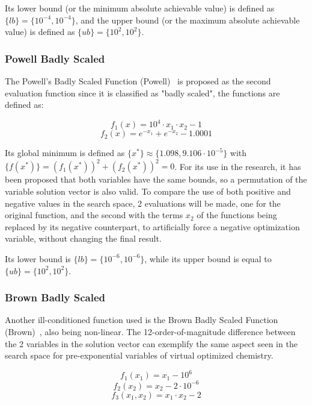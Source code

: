 \documentclass[10pt,fleqn,a4paper,twoside]{article}
\begin{document}
Its lower bound (or the minimum absolute achievable value) is defined as $\{lb\} = \{10^{-4}, 10^{-4}\}$, and the upper bound (or the maximum absolute achievable value) is defined as $\{ub\} = \{10^{2}, 10^{2}\}$.



\subsubsection{Powell Badly Scaled}
The Powell's Badly Scaled Function (Powell)~\citep{More1981TestFunctions} is proposed as the second evaluation function since it is classified as "badly scaled", the functions are defined as:

\begin{equation}
f_1(x) = 10^4 \cdot x_1 \cdot x_2 -1
\label{Eq:powell1}
\end{equation}
\begin{equation}
f_2(x) = e^{-x_1} + e^{-x_2} - 1.0001 
\label{Eq:powell2}
\end{equation}

Its global minimum is defined as $\{x^*\} \approx \{1.098, 9.106\cdot10^{-5}\}$ with $\{f(x^*)\} = (f_1(x^*))^2 + (f_2(x^*))^2 = 0$. For its use in the research, it has been proposed that 
both variables have the same bounds, so a permutation of the variable solution vector is also valid. To compare the use of both positive and negative values in the search space,
2 evaluations will be made, one for the original function, and the second with the terms $x_2$ of the functions being replaced by its negative counterpart, to artificially force a negative 
optimization variable, without changing the final result.

Its lower bound is $\{lb\} = \{10^{-6}, 10^{-6}\}$, while its upper bound is equal to $\{ub\} = \{10^{2}, 10^{2}\}$.


\subsubsection{Brown Badly Scaled}
Another ill-conditioned function used is the Brown Badly Scaled Function (Brown)~\citep{More1981TestFunctions}, also being non-linear.  The 12-order-of-magnitude difference between the 2 variables in the solution 
vector can exemplify the same aspect seen in the search space for pre-exponential variables of virtual optimized chemistry.

\begin{equation}
f_1(x_1) = x_1 - 10^{6}
\label{Eq:brown1} 
\end{equation}
\begin{equation}
f_2(x_2) = x_2 - 2\cdot 10^{-6}
\label{Eq:brown2}
\end{equation}
\begin{equation}
f_3(x_1,x_2) = x_1 \cdot x_2 - 2
\label{Eq:brown3}
\end{equation}
\end{document}
